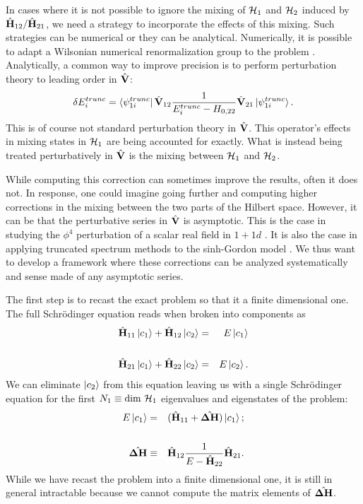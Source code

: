 \documentclass[twocolumn,secnumarabic,amssymb, nobibnotes, aps, prd]{revtex4-2}
\newcommand{\Hll}{\hat{\bf H}_{11}}
\newcommand{\Hhh}{\hat{\bf H}_{22}}
\newcommand{\Hhl}{\hat{\bf H}_{21}}
\newcommand{\Hlh}{\hat{\bf H}_{12}}
\newcommand{\Vhl}{\hat{\bf V}_{21}}
\newcommand{\Vlh}{\hat{\bf V}_{12}}
\newcommand{\V}{\hat{\bf V}}
\begin{document}
In cases where it is not possible to ignore the mixing of ${\cal H}_1$ and ${\cal H}_2$ induced by $\Hlh/\Hhl$, we need a strategy to incorporate the effects of this mixing.
Such strategies can be numerical or they can be analytical.  Numerically, it is possible to adapt a Wilsonian numerical renormalization group to the problem \cite{nrg}. Analytically, a common way to improve precision is to perform perturbation theory to leading order in $\V$:
\begin{equation}
    \delta E^{trunc}_i = \bra{\psi^{trunc}_{1i}}\Vlh\frac{1}{E^{trunc}_{i}-H_{0,22}}\Vhl\ket{\psi^{trunc}_{1i}}.
\end{equation}
This is of course not standard perturbation theory in $\V$.  This operator's effects in mixing states in ${\cal H}_1$ are being accounted for exactly.  What is instead being treated perturbatively in $\V$ is the mixing between ${\cal H}_1$ and ${\cal H}_2$.

While computing this correction can sometimes improve the results, often it does not. In response, one could imagine going further and computing higher corrections in the mixing between the two parts of the Hilbert space.  However, it can be that the perturbative series in $\V$ is asymptotic.  This is the case in studying the $\phi^4$ perturbation of a scalar real field in $1+1d$ \cite{Elias-Miro:2017tup}.  It is also the case in applying truncated spectrum methods to the sinh-Gordon model \cite{sinhgordon}. We thus want to develop a framework where these corrections can be analyzed systematically and sense made of any asymptotic series.

\newcommand{\DlH}{\hat {\bf \Delta H}}
The first step is to recast the exact problem so that it a finite dimensional one.  The full Schr\"odinger equation reads when broken into components as
\begin{eqnarray}
    \Hll\ket{c_1} + \Hlh\ket{c_2} &=& E\ket{c_1}\cr\cr
    \Hhl\ket{c_1} + \Hhh\ket{c_2} &=& E\ket{c_2}.
\end{eqnarray}
We can eliminate $\ket{c_2}$ from this equation leaving us with a single Schr\"odinger equation for the first $N_1\equiv {\rm dim}~{\cal H}_1$ eigenvalues and eigenstates of the problem:
\begin{eqnarray}
    E\ket{c_1} &=& (\Hll + \DlH)\ket{c_1};\cr\cr
  \DlH &\equiv& \Hlh\frac{1}{E-\Hhh}\Hhl.
\end{eqnarray}
While we have recast the problem into a finite dimensional one, it is still in general intractable because we cannot compute the matrix elements of $\DlH$.
\end{document}
